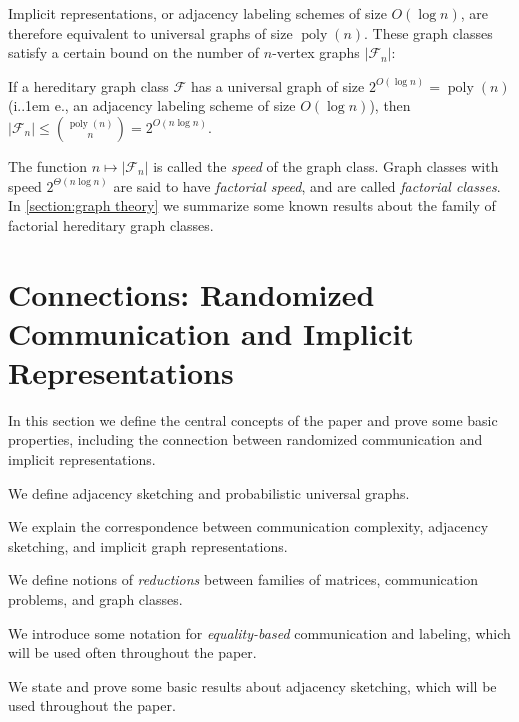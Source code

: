 \documentclass{theoretics}
\makeatletter
\DeclareMathOperator{\poly}{poly}
\newcommand{\cF}{\ensuremath{\mathcal{F}}}
\newcommand*\ie{i.\kern.1em e.\@\xspace} %
\makeatother
\begin{document}
Implicit representations, or adjacency labeling schemes of size $O(\log n)$, are therefore
equivalent to universal graphs of size $\poly(n)$. These graph classes satisfy a certain bound on
the number of $n$-vertex graphs $|\cF_n|$:

\begin{proposition}
\label{prop:knr}
If a hereditary graph class $\cF$ has a universal graph of size $2^{O(\log n)}=\poly(n)$
(\ie, an adjacency labeling scheme of size $O(\log n)$), then $|\cF_n|
\leq \binom{\poly(n)}{n} = 2^{O(n \log n)}$.
\end{proposition}

The function $n \mapsto |\cF_n|$ is called the \emph{speed} of the graph class. Graph classes with
speed $2^{\Theta(n \log n)}$ are said to have \emph{factorial speed}, and are called
\emph{factorial classes}.  In \cref{section:graph theory} we summarize some known results about the family of factorial hereditary graph classes.

\section{Connections: Randomized Communication and Implicit Representations}
\label{section:definitions}

In this section we define the central concepts of the paper and prove some basic properties,
including the connection between randomized communication and implicit representations.
\begin{description}[itemsep=0pt]
\item[\cref{section:adjacency-labeling}:] We define adjacency sketching and probabilistic
universal graphs.
\item[\cref{section:correspondence}:] We explain the correspondence between communication
complexity, adjacency sketching, and implicit graph representations.
\item[\cref{section:reductions}:] We define notions of \emph{reductions} between families of
matrices, communication problems, and graph classes.
\item[\cref{section:equality-based-labeling}:] We introduce some notation for
\emph{equality-based} communication and labeling, which will be used often throughout the paper.
\item[\cref{sec:bounded-arboricity}:] We state and prove some basic results about adjacency
sketching, which will be used throughout the paper.
\end{description}
\end{document}
